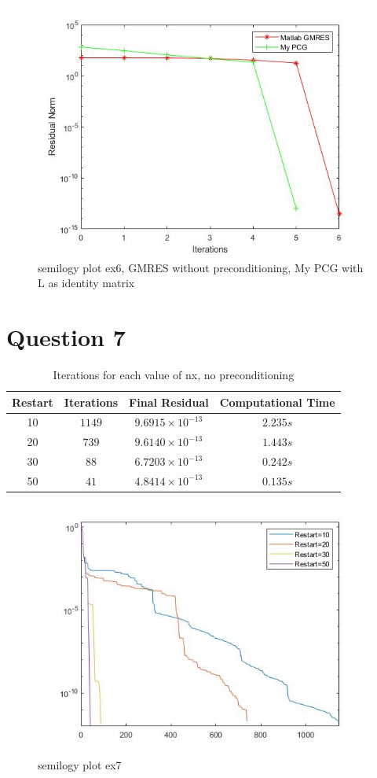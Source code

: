 \documentclass[a4paper, 11pt]{article}
\begin{document}
		\begin{figure}[H]
			\centering
			\includegraphics[width=.6\linewidth]{ex6.jpg}
			\caption{semilogy plot ex6, GMRES without preconditioning, My PCG with L as identity matrix}
			\label{fig:ex6_c_NoPrec}
		\end{figure}
		
		
		
		\section*{Question 7}
		
		\begin{table}[H]
			\centering
			\begin{tabular}{c|c|c|c}
				\textbf{Restart} &  \textbf{Iterations} 	& \textbf{Final Residual} 		& \textbf{Computational Time} 	\\ \hline
				10			& 			$1149$ 		& $ 9.6915 \times 10^{-13} $ 	& $ 2.235 s $	\\ \hline	
				20			& 			$739$		& $ 9.6140 \times 10^{-13} $	& $ 1.443 s $	\\ \hline
				30			& 			$88$ 		& $ 6.7203 \times 10^{-13} $ 	& $ 0.242 s $	\\ \hline	
				50			& 			$41$		& $ 4.8414 \times 10^{-13} $	& $ 0.135 s $	\\ \hline
			\end{tabular}
			\caption{Iterations for each value of nx, no preconditioning}
			\label{table:ex7}
		\end{table}
		
		\begin{figure}[H]
			\centering
			\includegraphics[width=.6\linewidth]{ex7.jpg}
			\caption{semilogy plot ex7}
			\label{fig:ex7}
		\end{figure}
	
\end{document}
